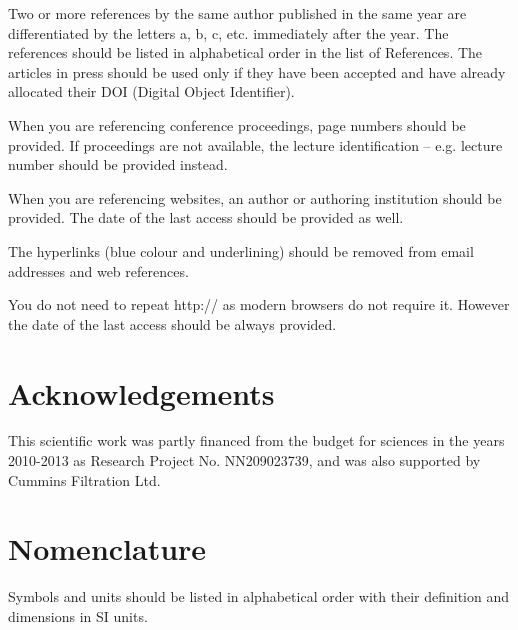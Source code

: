 \documentclass[twocolumn, 10pt]{article}
\begin{document}
Two or more references by the same author published in the same year are differentiated by the letters a, b, c, etc. immediately after the year. The references should be listed in alphabetical order in the list of References. The articles in press should be used only if they have been accepted and 
have already allocated their DOI (Digital Object Identifier).

When you are referencing conference proceedings, page numbers should be provided. If proceedings are not available, the lecture identification -- e.g. lecture number should be provided instead.

When you are referencing websites, an author or authoring institution should be provided. The date of the last access should be provided as well.

The hyperlinks (blue colour and underlining) should be removed from email addresses and web references.

You do not need to repeat http:// as modern browsers do not require it. However the date of the last access should be always provided.

\section*{Acknowledgements}

This scientific work was partly financed from the budget for sciences in the years 2010-2013 as Research Project No. NN209023739, and was also supported by Cummins Filtration Ltd.

\newpage
\section*{Nomenclature}

Symbols and units should be listed in alphabetical order with their 
definition and dimensions in SI units.
\end{document}
